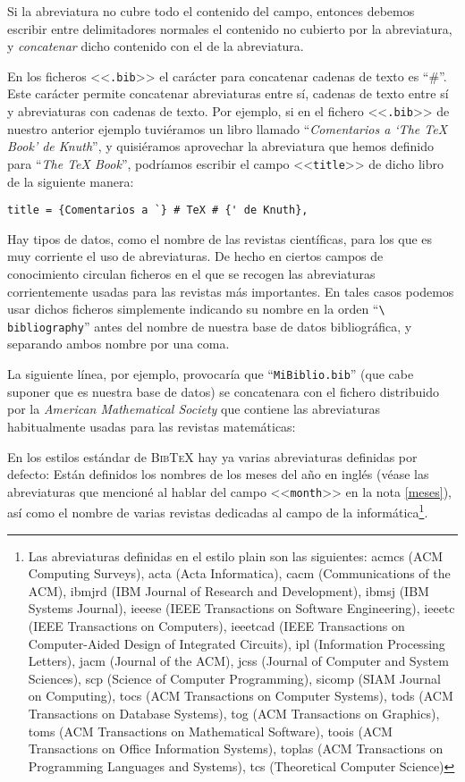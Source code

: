 \documentclass[a4paper,11pt]{article}
\def\btx-{\textsc{Bib\TeX}}
\def\ltr#1-{<<\texttt{#1}>>}
\def\tpf#1-{\ltr.#1-}
\def\cmd#1-{``\texttt{\textbackslash#1}''}
\begin{document}
Si  la abreviatura  no cubre  todo el  contenido del  campo,  entonces debemos
escribir  entre  delimitadores  normales  el  contenido  no  cubierto  por  la
abreviatura, y \emph{concatenar} dicho contenido con el de la abreviatura.

En los  ficheros \tpf  bib- el  carácter para concatenar  cadenas de  texto es
``\#''.  Este  carácter permite concatenar  abreviaturas entre sí,  cadenas de
texto entre  sí y abreviaturas  con cadenas de  texto.  Por ejemplo, si  en el
fichero  \tpf bib-  de nuestro  anterior ejemplo  tuviéramos un  libro llamado
``\emph{Comentarios a `The TeX Book'  de Knuth}'', y quisiéramos aprovechar la
abreviatura  que  hemos  definido  para  ``\emph{The  TeX  Book}'',  podríamos
escribir el campo \ltr title- de dicho libro de la siguiente manera:

\verb|title = {Comentarios a `} # TeX # {' de Knuth},|

Hay tipos de  datos, como el nombre de las revistas  científicas, para los que
es  muy corriente  el uso  de  abreviaturas.  De  hecho en  ciertos campos  de
conocimiento  circulan  ficheros  en   el  que  se  recogen  las  abreviaturas
corrientemente  usadas para  las  revistas más  importantes.   En tales  casos
podemos usar dichos ficheros simplemente  indicando su nombre en la orden \cmd
bibliography-  antes del  nombre de  nuestra  base de  datos bibliográfica,  y
separando ambos nombre por una coma.

La siguiente línea, por ejemplo, provocaría que ``\texttt{MiBiblio.bib}'' (que
cabe  suponer que  es nuestra  base de  datos) se  concatenara con  el fichero
distribuido  por  la \emph{American  Mathematical  Society}  que contiene  las
abreviaturas habitualmente usadas para las revistas matemáticas:

\verb||

En  los estilos estándar  de \btx-  hay ya  varias abreviaturas  definidas por
defecto: Están definidos los nombres de los meses del año en inglés (véase las
abreviaturas  que  mencioné  al  hablar  del  campo \ltr  month-  en  la  nota
\ref{meses}), así como  el nombre de varias revistas dedicadas  al campo de la
informática\footnote{Las  abreviaturas definidas  en el  estilo plain  son las
  siguientes:  acmcs (ACM  Computing Surveys),  acta (Acta  Informatica), cacm
  (Communications  of   the  ACM),  ibmjrd   (IBM  Journal  of   Research  and
  Development),  ibmsj (IBM  Systems  Journal), ieeese  (IEEE Transactions  on
  Software  Engineering), ieeetc  (IEEE Transactions  on  Computers), ieeetcad
  (IEEE  Transactions on  Computer-Aided Design  of Integrated  Circuits), ipl
  (Information Processing  Letters), jacm (Journal of the  ACM), jcss (Journal
  of  Computer and System  Sciences), scp  (Science of  Computer Programming),
  sicomp  (SIAM Journal  on  Computing), tocs  (ACM  Transactions on  Computer
  Systems), tods (ACM Transactions on Database Systems), tog (ACM Transactions
  on Graphics),  toms (ACM Transactions on Mathematical  Software), toois (ACM
  Transactions  on Office  Information Systems),  toplas (ACM  Transactions on
  Programming Languages and Systems), tcs (Theoretical Computer Science)}.
\end{document}
